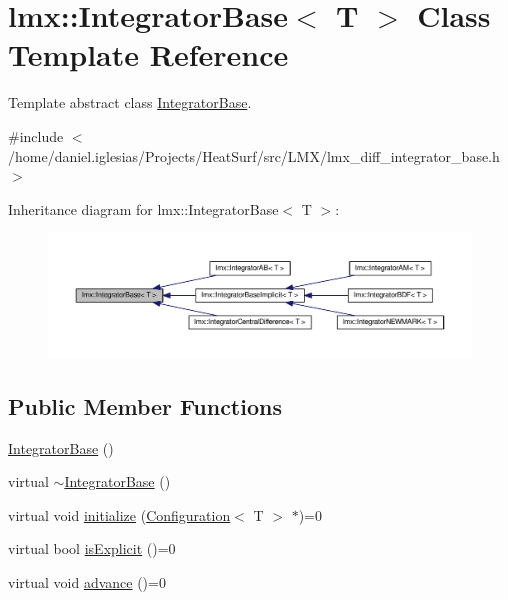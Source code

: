 \hypertarget{classlmx_1_1IntegratorBase}{\section{lmx\-:\-:Integrator\-Base$<$ T $>$ Class Template Reference}
\label{classlmx_1_1IntegratorBase}
}


Template abstract class \hyperlink{classlmx_1_1IntegratorBase}{Integrator\-Base}.  




{\ttfamily \#include $<$/home/daniel.\-iglesias/\-Projects/\-Heat\-Surf/src/\-L\-M\-X/lmx\-\_\-diff\-\_\-integrator\-\_\-base.\-h$>$}



Inheritance diagram for lmx\-:\-:Integrator\-Base$<$ T $>$\-:
\nopagebreak
\begin{figure}[H]
\begin{center}
\leavevmode
\includegraphics[width=350pt]{classlmx_1_1IntegratorBase__inherit__graph}
\end{center}
\end{figure}
\subsection*{Public Member Functions}
\begin{DoxyCompactItemize}
\item 
\hyperlink{classlmx_1_1IntegratorBase_ac8fe7d9b211d6d86b4377a3ab57399fc}{Integrator\-Base} ()
\item 
virtual \hyperlink{classlmx_1_1IntegratorBase_a44f52dfb85513d84a2d3e5a1dbd73b94}{$\sim$\-Integrator\-Base} ()
\item 
virtual void \hyperlink{classlmx_1_1IntegratorBase_a9ddf427bbc2267c264222552d5fa47c6}{initialize} (\hyperlink{classlmx_1_1Configuration}{Configuration}$<$ T $>$ $\ast$)=0
\item 
virtual bool \hyperlink{classlmx_1_1IntegratorBase_a78adaaa37562ad47226ee2192fd44bd0}{is\-Explicit} ()=0
\item 
virtual void \hyperlink{classlmx_1_1IntegratorBase_ab671aed2798b57bd80e831dd2d0d49cf}{advance} ()=0
\end{DoxyCompactItemize}


